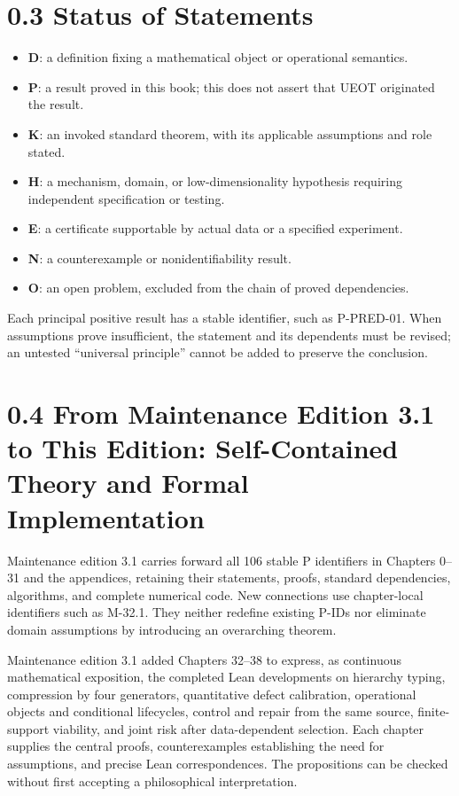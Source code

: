 \documentclass[
  english,
  11pt,
  oneside]{book}
\providecommand{\tightlist}{%
  \setlength{\itemsep}{0pt}\setlength{\parskip}{0pt}}
\begin{document}
\section{0.3 Status of Statements}\label{status-of-statements}

\begin{itemize}
\tightlist
\item
  \textbf{D}: a definition fixing a mathematical object or operational semantics.
\item
  \textbf{P}: a result proved in this book; this does not assert that UEOT originated the result.
\item
  \textbf{K}: an invoked standard theorem, with its applicable assumptions and role stated.
\item
  \textbf{H}: a mechanism, domain, or low-dimensionality hypothesis requiring independent specification or testing.
\item
  \textbf{E}: a certificate supportable by actual data or a specified experiment.
\item
  \textbf{N}: a counterexample or nonidentifiability result.
\item
  \textbf{O}: an open problem, excluded from the chain of proved dependencies.
\end{itemize}

Each principal positive result has a stable identifier, such as P-PRED-01. When assumptions prove insufficient, the statement and its dependents must be revised; an untested ``universal principle'' cannot be added to preserve the conclusion.

\section{0.4 From Maintenance Edition 3.1 to This Edition: Self-Contained Theory and Formal Implementation}\label{from-maintenance-edition-3.1-to-this-edition-self-contained-theory-and-formal-implementation}

Maintenance edition 3.1 carries forward all 106 stable P identifiers in Chapters 0--31 and the appendices, retaining their statements, proofs, standard dependencies, algorithms, and complete numerical code. New connections use chapter-local identifiers such as M-32.1. They neither redefine existing P-IDs nor eliminate domain assumptions by introducing an overarching theorem.

Maintenance edition 3.1 added Chapters 32--38 to express, as continuous mathematical exposition, the completed Lean developments on hierarchy typing, compression by four generators, quantitative defect calibration, operational objects and conditional lifecycles, control and repair from the same source, finite-support viability, and joint risk after data-dependent selection. Each chapter supplies the central proofs, counterexamples establishing the need for assumptions, and precise Lean correspondences. The propositions can be checked without first accepting a philosophical interpretation.
\end{document}
